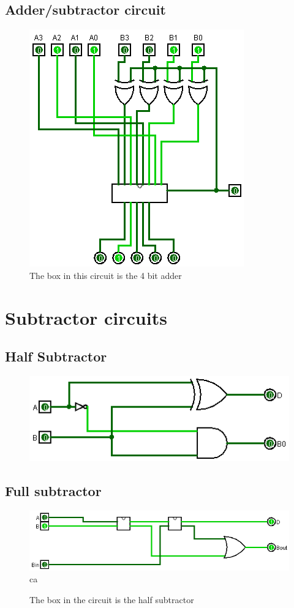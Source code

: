 \documentclass[12pt]{article}
\begin{document}
    \subsection{Adder/subtractor circuit}
    \begin{center}
        \begin{figure}[ht]
            \includegraphics[scale=0.50]{addsub.png}
            \caption{The box in this circuit is the 4 bit adder}
        \end{figure}
    \end{center}
    \section{Subtractor circuits}
    \subsection{Half Subtractor}
    \begin{center}
        \begin{figure}[ht]
            \includegraphics[scale=0.50]{halfsub.png}
        \end{figure}
    \end{center}
    \subsection{Full subtractor}
    \begin{center}
        \begin{figure}[ht]
            \includegraphics[scale=0.50]{fullsub.png}ca
            \caption{The box in the circuit is the half subtractor}
        \end{figure}
    \end{center}
\end{document}
